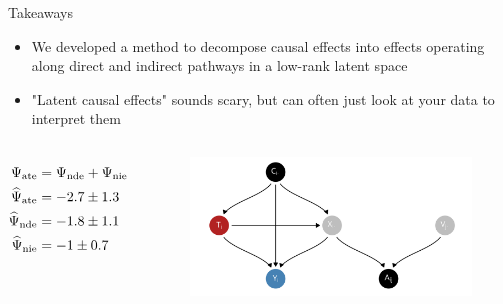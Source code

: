 \documentclass[aspectratio=169]{beamer}
\theoremstyle{remark}
\begin{document}
\begin{frame}{Takeaways}

    \begin{itemize}
        \item We developed a method to decompose causal effects into effects operating along direct and indirect pathways in a low-rank latent space
        \item "Latent causal effects" sounds scary, but can often just look at your data to interpret them
    \end{itemize}

    \begin{columns}
        \begin{align*}
            \Psi_\mathrm{ate}    & = \Psi_\mathrm{nde} + \Psi_\mathrm{nie}  \\
            \widehat{\Psi}_\mathrm{ate} & = -2.7 \pm 1.3 \\
            \widehat{\Psi}_\mathrm{nde} & = -1.8 \pm 1.1 \\
            \widehat{\Psi}_\mathrm{nie} & = -1 \pm 0.7
        \end{align*}
        \centering
        \begin{figure}[ht]
            \includegraphics[width=\textwidth]{figures/dags/bipartite-mediation.png}
        \end{figure}
    \end{columns}
\end{frame}





\end{document}
